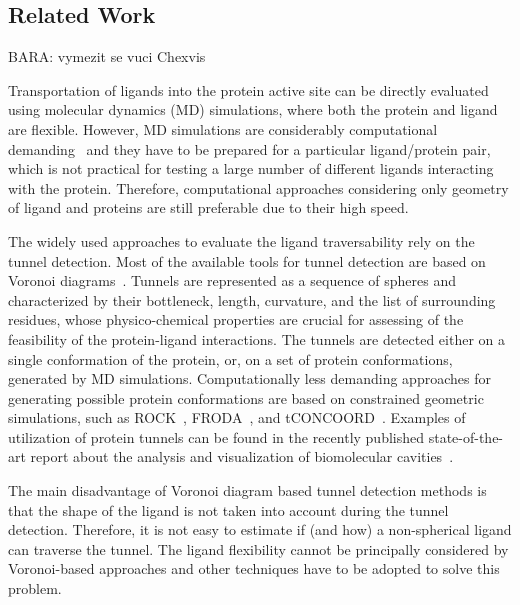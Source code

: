 \documentclass{bmcart}
\begin{document}
\subsection*{Related Work}

{\color{red}BARA: vymezit se vuci Chexvis \cite{masood2015chexvis}}

Transportation of ligands into the protein active site can be directly evaluated using molecular dynamics (MD) simulations, where both the protein and ligand are flexible.
However, MD simulations are considerably computational demanding~\cite{kingsley2014including} and they have to be prepared
for a particular ligand/protein pair, which is not practical for testing a large number of different ligands interacting with the protein.
Therefore, computational approaches considering only geometry of ligand and proteins are still preferable due to their high speed.

The widely used approaches to evaluate the ligand traversability rely on the tunnel detection.
Most of the available tools for tunnel detection are based on Voronoi diagrams~\cite{yaffe2008,caver3,sehnal2013mole}.
Tunnels are represented as a sequence of spheres and characterized by their bottleneck, length, curvature, and the list of surrounding residues, whose physico-chemical properties are crucial for assessing of the feasibility of the protein-ligand interactions.
The tunnels are detected either on a single conformation of the protein, or, on a set of protein conformations, generated by MD simulations.
Computationally less demanding approaches for generating possible protein conformations are based on constrained geometric simulations, such as
ROCK~\cite{lei2004sampling}, FRODA~\cite{wells2005constrained}, and tCONCOORD~\cite{seeliger2007geometry}.
Examples of utilization of protein tunnels can be found in the recently published state-of-the-art report about the analysis and visualization of biomolecular cavities~\cite{Krone_2016}.

The main disadvantage of Voronoi diagram based tunnel detection methods is that the shape of the ligand is not taken into account during the tunnel detection.
Therefore, it is not easy to estimate if (and how) a non-spherical ligand can traverse the tunnel.
The ligand flexibility cannot be principally considered by Voronoi-based approaches and other techniques have to be adopted to solve this problem.
\end{document}
